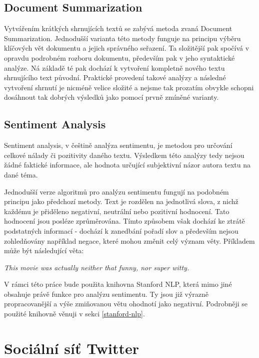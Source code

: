 \documentclass[thesis=B,czech]{FITthesis}[2012/06/26]
\begin{document}
\subsection{Document Summarization}
	Vytvářením krátkých shrnujících textů se zabývá metoda zvaná Document Summarization. Jednodušší varianta této metody funguje na principu výběru klíčových vět dokumentu a jejich správného seřazení. Ta složitější pak spočívá v opravdu podrobném rozboru dokumentu, především pak v jeho syntaktické analýze. Ná základě té pak dochází k vytvoření kompletně nového textu shrnujícího text původní. Praktické provedení takové analýzy a následné vytvoření shrnutí je nicméně velice složité a nejsme tak prozatím obvykle schopni dosáhnout tak dobrých výsledků jako pomocí prvně zmíněné varianty\cite{aaaa}. 


\subsection{Sentiment Analysis}
\label{sentiment-analysis}
	Sentiment analysis, v češtině analýza sentimentu, je metodou pro určování celkové nálady či pozitivity daného textu. Výsledkem této analýzy tedy nejsou žádné faktické informace, ale hodnota určující subjektivní názor autora textu na dané téma. 
	
	Jednodušší verze algoritmů pro analýzu sentimentu fungují na podobném principu jako předchozí metody. Text je rozdělen na jednotlivá slova, z nichž každému je přiděleno negativní, neutrální nebo pozitivní hodnocení. Tato hodnocení jsou posléze zprůměrována. Tímto způsobem však dochází ke ztrátě podstatných informací - dochází k zanedbání pořadí slov a především nejsou zohledňovány například negace, které mohou změnit celý význam věty. Příkladem může být následující věta:

\vspace{\baselineskip}
\textit{This movie was actually neither that funny, nor super witty.}	
\vspace{\baselineskip}

	V rámci této práce bude použita knihovna Stanford NLP\cite{sssss}, která mimo jiné obsahuje právě funkce pro analýzu sentimentu. Ty jsou již výrazně propracovanější a výše zmiňovanou větu ohodnotí jako negativní. Podrobněji se použité knihovně věnuji v sekci \ref{stanford-nlp}.


\section{Sociální síť Twitter}
\label{twitter}
	
\end{document}
